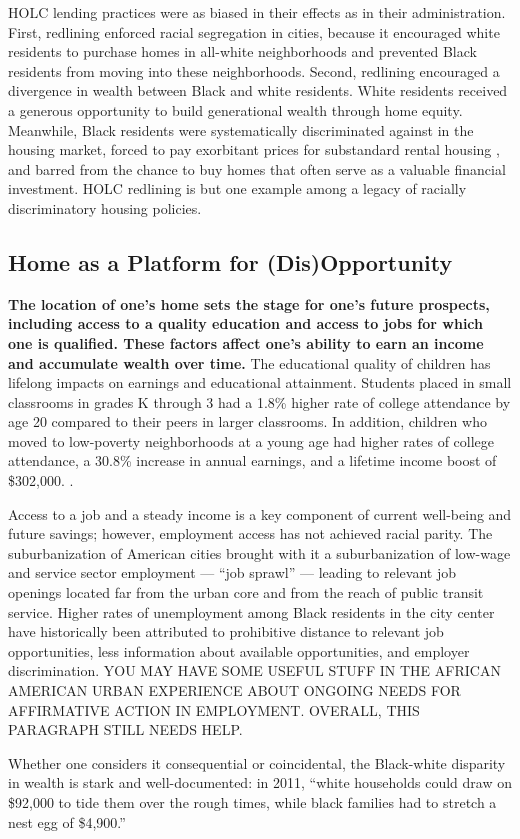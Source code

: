\documentclass[paper=letter, fontsize=12pt]{scrartcl} %
\begin{document}
HOLC lending practices were as biased in their effects as in their administration. First, redlining enforced racial segregation in cities, because it encouraged white residents to purchase homes in all-white neighborhoods and prevented Black residents from moving into these neighborhoods. Second, redlining encouraged a divergence in wealth between Black and white residents. White residents received a generous opportunity to build generational wealth through home equity. Meanwhile, Black residents were systematically discriminated against in the housing market, forced to pay exorbitant prices for substandard rental housing \cite{orfield}, and barred from the chance to buy homes that often serve as a valuable financial investment. HOLC redlining is but one example among a legacy of racially discriminatory housing policies.\par

\subsection{Home as a Platform for (Dis)Opportunity}
\textbf{The location of one's home sets the stage for one's future prospects, including access to a quality education and access to jobs for which one is qualified. These factors affect one's ability to earn an income and accumulate wealth over time.} The educational quality of children has lifelong impacts on earnings and educational attainment. Students placed in small classrooms in grades K through 3 had a 1.8\% higher rate of college attendance by age 20 compared to their peers in larger classrooms. \cite{chetty2} In addition, children who moved to low-poverty neighborhoods at a young age had higher rates of college attendance, a 30.8\% increase in annual earnings, and a lifetime income boost of \$302,000. \cite{chetty}.\par
Access to a job and a steady income is a key component of current well-being and future savings; however, employment access has not achieved racial parity. The suburbanization of American cities brought with it a suburbanization of low-wage and service sector employment --- ``job sprawl'' --- leading to relevant job openings located far from the urban core and from the reach of public transit service. \cite{briggs} Higher rates of unemployment among Black residents in the city center have historically been attributed to prohibitive distance to relevant job opportunities, less information about available opportunities, and employer discrimination. \cite{kain1} YOU MAY HAVE SOME USEFUL STUFF IN THE AFRICAN AMERICAN URBAN EXPERIENCE ABOUT ONGOING NEEDS FOR AFFIRMATIVE ACTION IN EMPLOYMENT. OVERALL, THIS PARAGRAPH STILL NEEDS HELP.\par
Whether one considers it consequential or coincidental, the Black-white disparity in wealth is stark and well-documented: in 2011, ``white households could draw on \$92,000 to tide them over the rough times, while black families had to stretch a nest egg of \$4,900.'' \cite{goldfield}\par
\end{document}
